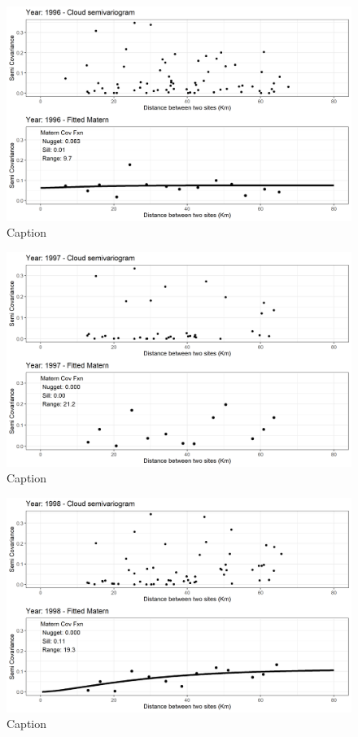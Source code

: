 \begin{figure}
    \centering
    \includegraphics{Figures/EmpiricalVariograms/Empirical_Variogram_1996.png}
    \caption{Caption}
    \label{fig:my_label}
\end{figure}

\begin{figure}
    \centering
    \includegraphics{Figures/EmpiricalVariograms/Empirical_Variogram_1997.png}
    \caption{Caption}
    \label{fig:my_label}
\end{figure}

\begin{figure}
    \centering
    \includegraphics{Figures/EmpiricalVariograms/Empirical_Variogram_1998.png}
    \caption{Caption}
    \label{fig:my_label}
\end{figure}


